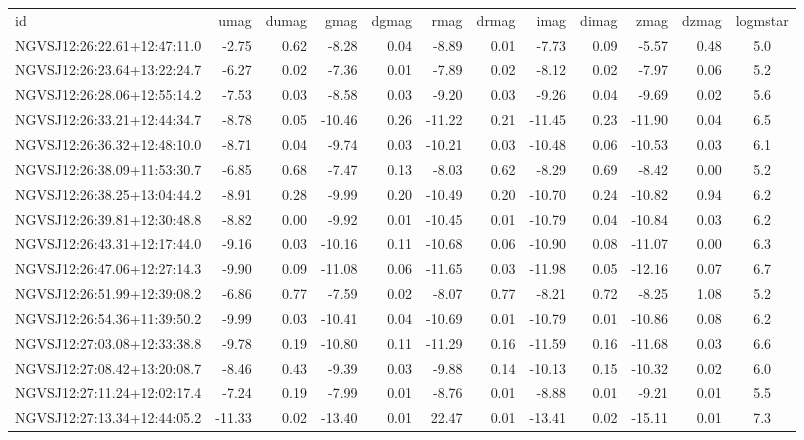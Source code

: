 \begin{tabular}{lrrrrrrrrrrc}
id & umag & dumag & gmag & dgmag & rmag & drmag & imag & dimag & zmag & dzmag & logmstar \\
NGVSJ12:26:22.61+12:47:11.0 & -2.75 & 0.62 & -8.28 & 0.04 & -8.89 & 0.01 & -7.73 & 0.09 & -5.57 & 0.48 & 5.0 \\
NGVSJ12:26:23.64+13:22:24.7 & -6.27 & 0.02 & -7.36 & 0.01 & -7.89 & 0.02 & -8.12 & 0.02 & -7.97 & 0.06 & 5.2 \\
NGVSJ12:26:28.06+12:55:14.2 & -7.53 & 0.03 & -8.58 & 0.03 & -9.20 & 0.03 & -9.26 & 0.04 & -9.69 & 0.02 & 5.6 \\
NGVSJ12:26:33.21+12:44:34.7 & -8.78 & 0.05 & -10.46 & 0.26 & -11.22 & 0.21 & -11.45 & 0.23 & -11.90 & 0.04 & 6.5 \\
NGVSJ12:26:36.32+12:48:10.0 & -8.71 & 0.04 & -9.74 & 0.03 & -10.21 & 0.03 & -10.48 & 0.06 & -10.53 & 0.03 & 6.1 \\
NGVSJ12:26:38.09+11:53:30.7 & -6.85 & 0.68 & -7.47 & 0.13 & -8.03 & 0.62 & -8.29 & 0.69 & -8.42 & 0.00 & 5.2 \\
NGVSJ12:26:38.25+13:04:44.2 & -8.91 & 0.28 & -9.99 & 0.20 & -10.49 & 0.20 & -10.70 & 0.24 & -10.82 & 0.94 & 6.2 \\
NGVSJ12:26:39.81+12:30:48.8 & -8.82 & 0.00 & -9.92 & 0.01 & -10.45 & 0.01 & -10.79 & 0.04 & -10.84 & 0.03 & 6.2 \\
NGVSJ12:26:43.31+12:17:44.0 & -9.16 & 0.03 & -10.16 & 0.11 & -10.68 & 0.06 & -10.90 & 0.08 & -11.07 & 0.00 & 6.3 \\
NGVSJ12:26:47.06+12:27:14.3 & -9.90 & 0.09 & -11.08 & 0.06 & -11.65 & 0.03 & -11.98 & 0.05 & -12.16 & 0.07 & 6.7 \\
NGVSJ12:26:51.99+12:39:08.2 & -6.86 & 0.77 & -7.59 & 0.02 & -8.07 & 0.77 & -8.21 & 0.72 & -8.25 & 1.08 & 5.2 \\
NGVSJ12:26:54.36+11:39:50.2 & -9.99 & 0.03 & -10.41 & 0.04 & -10.69 & 0.01 & -10.79 & 0.01 & -10.86 & 0.08 & 6.2 \\
NGVSJ12:27:03.08+12:33:38.8 & -9.78 & 0.19 & -10.80 & 0.11 & -11.29 & 0.16 & -11.59 & 0.16 & -11.68 & 0.03 & 6.6 \\
NGVSJ12:27:08.42+13:20:08.7 & -8.46 & 0.43 & -9.39 & 0.03 & -9.88 & 0.14 & -10.13 & 0.15 & -10.32 & 0.02 & 6.0 \\
NGVSJ12:27:11.24+12:02:17.4 & -7.24 & 0.19 & -7.99 & 0.01 & -8.76 & 0.01 & -8.88 & 0.01 & -9.21 & 0.01 & 5.5 \\
NGVSJ12:27:13.34+12:44:05.2 & -11.33 & 0.02 & -13.40 & 0.01 & 22.47 & 0.01 & -13.41 & 0.02 & -15.11 & 0.01 & 7.3 \\

\end{tabular}

